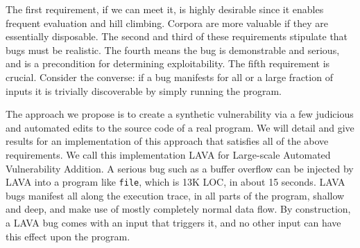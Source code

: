 \noindent
The first requirement, if we can meet it, is highly desirable since it enables frequent evaluation and hill climbing. 
Corpora are more valuable if they are essentially disposable. 
The second and third of these requirements stipulate that bugs must be realistic.
The fourth means the bug is demonstrable and serious, and is a precondition for determining exploitability. 
The fifth requirement is crucial.
Consider the converse: if a bug manifests for all or a large fraction of inputs it is trivially discoverable by simply running the program.

The approach we propose is to create a synthetic vulnerability via a few judicious and automated edits to the source code of a real program.
We will detail and give results for an implementation of this approach that satisfies all of the above requirements.
We call this implementation LAVA for Large-scale Automated Vulnerability Addition.    
A serious bug such as a buffer overflow can be injected by LAVA into a program like \verb+file+, which is 13K LOC, in about 15 seconds.
LAVA bugs manifest all along the execution trace, in all parts of the program, shallow and deep, and make use of mostly completely normal data flow.
By construction, a LAVA bug comes with an input that triggers it, and no other input can have this effect upon the program.
